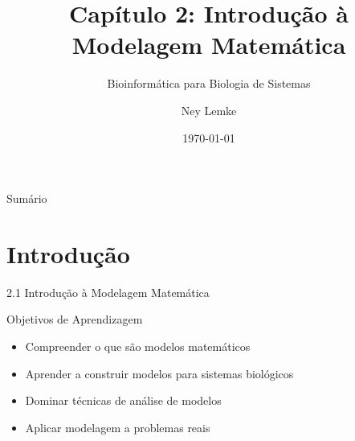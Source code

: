 


\title[Cap. 2: Modelagem Matemática]{Capítulo 2: Introdução à Modelagem Matemática}
\subtitle{Bioinformática para Biologia de Sistemas}
\author{Ney Lemke}
\date{\today}

\usetikzlibrary{decorations.pathmorphing, positioning}


\begin{frame}
\titlepage
\end{frame}

\begin{frame}{Sumário}
\tableofcontents
\end{frame}

\section{Introdução}

\begin{frame}[shrink=5]{2.1 Introdução à Modelagem Matemática}
\begin{block}{Objetivos de Aprendizagem}
\begin{itemize}
    \item Compreender o que são modelos matemáticos
    \item Aprender a construir modelos para sistemas biológicos
    \item Dominar técnicas de análise de modelos
    \item Aplicar modelagem a problemas reais
\end{itemize}
\end{block}

\vspace{0.3cm}

\end{frame}

